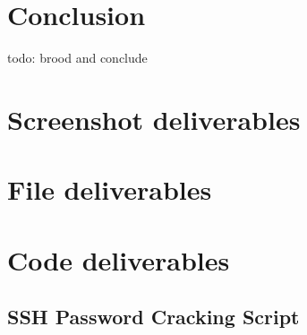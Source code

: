 \documentclass[12pt]{report}
\begin{document}
\pagebreak
\chapter{Conclusion}
todo: brood and conclude




\nocite{example:referenceid:here}

\begin{flushleft}
  
\end{flushleft}


\appendix

\pagebreak
\chapter{Screenshot deliverables}
\label{app:screenshots}

\pagebreak
\chapter{File deliverables}
\label{app:files}

\pagebreak
\chapter{Code deliverables}
\section{SSH Password Cracking Script}
\label{app:code:sshcrack_mp}

\end{document}
